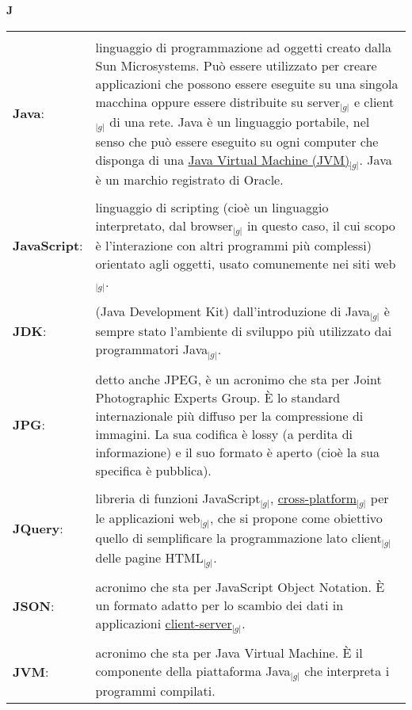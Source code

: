 \hfill\Huge{\textbf{J}}\\
\normalsize
\label{tabVers}
	\begin{longtable}{p{} p{}} 
	    \toprule
	    \\
	    \textbf{Java}:		&	linguaggio di programmazione ad oggetti creato dalla Sun Microsystems. Può essere utilizzato per creare applicazioni che possono essere eseguite su una singola macchina oppure essere distribuite 
						su server$_{|g|}$ e client$_{|g|}$ di una rete. Java è un linguaggio portabile, nel senso che può essere eseguito su ogni computer che disponga di una \underline{Java Virtual Machine (JVM)}$_{|g|}$. Java è un marchio registrato di Oracle.\\   
	    \\
	    \textbf{JavaScript}:	&	linguaggio di scripting (cioè un linguaggio interpretato, dal browser$_{|g|}$ in questo caso, il cui scopo è l’interazione con altri programmi più complessi) orientato agli oggetti, usato comunemente nei siti web$_{|g|}$.\\
	    \\
	    \textbf{JDK}:		&	(Java Development Kit) dall'introduzione di Java$_{|g|}$ è sempre stato l'ambiente di sviluppo più utilizzato dai programmatori Java$_{|g|}$.\\
	    \\
	    \textbf{JPG}:		&	detto anche JPEG, è un acronimo che sta per Joint Photographic Experts Group. \`E lo standard internazionale più diffuso per la compressione di immagini. 
						La sua codifica è lossy (a perdita di informazione) e il suo formato è aperto (cioè la sua specifica è pubblica).\\
	    \\
	    \textbf{JQuery}:		&	libreria di funzioni JavaScript$_{|g|}$, \underline{cross-platform}$_{|g|}$ per le applicazioni web$_{|g|}$, che si propone come obiettivo quello di semplificare la programmazione lato client$_{|g|}$ delle pagine HTML$_{|g|}$.\\
	    \\
	    \textbf{JSON}:		&	acronimo che sta per JavaScript Object Notation. \`E un formato adatto per lo scambio dei dati in applicazioni \underline{client-server}$_{|g|}$.\\
	    \\
	    \textbf{JVM}:		&	acronimo che sta per Java Virtual Machine. \`E il componente della piattaforma Java$_{|g|}$ che interpreta i programmi compilati.\\
	\end{longtable}
\newpage


